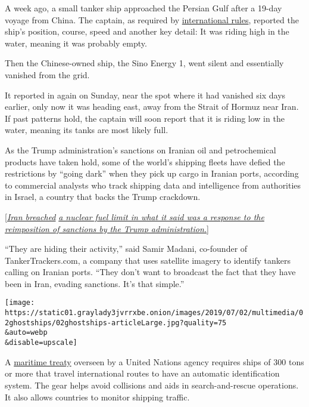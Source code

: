 A week ago, a small tanker ship approached the Persian Gulf after a
19-day voyage from China. The captain, as required by
\href{http://www.imo.org/en/OurWork/Safety/Navigation/Pages/AIS.aspx}{international
rules}, reported the ship's position, course, speed and another key
detail: It was riding high in the water, meaning it was probably empty.

Then the Chinese-owned ship, the Sino Energy 1, went silent and
essentially vanished from the grid.

It reported in again on Sunday, near the spot where it had vanished six
days earlier, only now it was heading east, away from the Strait of
Hormuz near Iran. If past patterns hold, the captain will soon report
that it is riding low in the water, meaning its tanks are most likely
full.

As the Trump administration's sanctions on Iranian oil and petrochemical
products have taken hold, some of the world's shipping fleets have
defied the restrictions by ``going dark'' when they pick up cargo in
Iranian ports, according to commercial analysts who track shipping data
and intelligence from authorities in Israel, a country that backs the
Trump crackdown.

{[}\href{https://www.nytimes3xbfgragh.onion/2019/07/01/world/middleeast/iran-uranium-enrichment-limit.html}{\emph{Iran
breached}}
\href{https://www.nytimes3xbfgragh.onion/2019/07/01/world/middleeast/iran-uranium-enrichment-limit.html}{\emph{a
nuclear fuel limit in what it said was a response to the reimposition of
sanctions by the Trump administration.}}{]}

``They are hiding their activity,'' said Samir Madani, co-founder of
TankerTrackers.com, a company that uses satellite imagery to identify
tankers calling on Iranian ports. ``They don't want to broadcast the
fact that they have been in Iran, evading sanctions. It's that simple.''

\texttt{[image: https://static01.graylady3jvrrxbe.onion/images/2019/07/02/multimedia/02ghostships/02ghostships-articleLarge.jpg?quality=75\\\&auto=webp\\\&disable=upscale]}

A
\href{http://www.imo.org/en/OurWork/Safety/Navigation/Pages/AIS.aspx}{maritime
treaty} overseen by a United Nations agency requires ships of 300 tons
or more that travel international routes to have an automatic
identification system. The gear helps avoid collisions and aids in
search-and-rescue operations. It also allows countries to monitor
shipping traffic.

